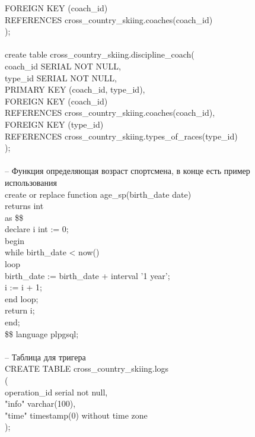 \documentclass[a4paper,12pt]{article}
\begin{document}
\indent FOREIGN KEY (coach\_id)\\
\indent \indent REFERENCES cross\_country\_skiing.coaches(coach\_id)\\
);\\
\\
create table cross\_country\_skiing.discipline\_coach(\\
\indent coach\_id SERIAL NOT NULL,\\
\indent type\_id SERIAL NOT NULL,\\
\indent PRIMARY KEY (coach\_id, type\_id),\\
\indent FOREIGN KEY (coach\_id)\\
\indent \indent REFERENCES cross\_country\_skiing.coaches(coach\_id),\\
\indent FOREIGN KEY (type\_id)\\
\indent \indent REFERENCES cross\_country\_skiing.types\_of\_races(type\_id)\\
);\\
\\
-- Функция определяющая возраст спортсмена, в конце есть пример использования\\
create or replace function age\_sp(birth\_date date)\\
returns int\\
as \$\$\\
declare i int := 0;\\
begin\\
\indent while birth\_date < now()\\
\indent loop\\
\indent \indent birth\_date := birth\_date + interval '1 year';\\
\indent \indent i := i + 1;\\
\indent end loop;\\
\indent return i;\\
end;\\
\$\$ language plpgsql;\\
\\
-- Таблица для тригера\\
CREATE TABLE cross\_country\_skiing.logs\\
(\\
\indent operation\_id serial not null,\\
\indent "info" varchar(100),\\
\indent "time" timestamp(0) without time zone\\
);\\
\\
\end{document}
